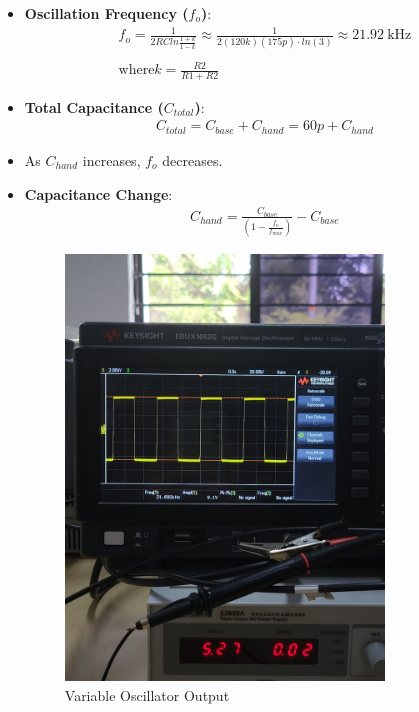 \documentclass[10pt,xcolor={table,dvipsnames},t]{beamer}
\begin{document}
\begin{itemize}
    \item \textbf{Oscillation Frequency ($f_o$)}:
    \begin{align*}
      f_o = \frac{1}{2R C ln\frac{1+k}{1-k}} \approx \frac{1}{2(120k)(175p)\cdot ln(3)} \approx \SI{21.92}{\kilo\hertz}
      \\\\ \text{where} k = \frac{R2}{R1+R2}  
    \end{align*}
    \item \textbf{Total Capacitance ($C_{total}$)}:
    \begin{align*}
    C_{total} = C_{base} + C_{hand} = 60p + C_{hand}
    \end{align*}
    \item As $C_{hand}$ increases, $f_o$ decreases.
    \item \textbf{Capacitance Change}:
    \begin{align*}
    C_{hand} = \frac{C_{base}}{(1 - \frac{f_o}{f_{max}})} - C_{base}
    \end{align*}
    \begin{figure}
        \centering
        \includegraphics[width=0.8\textwidth]{variable.jpeg}
        \caption{Variable Oscillator Output}
        \label{fig:Variable_Oscillator}
    \end{figure}     
\end{itemize}
\end{document}
